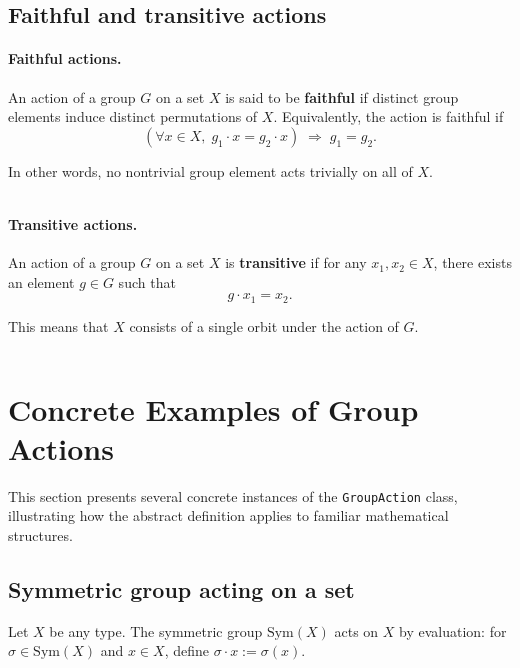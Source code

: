 \documentclass[
  12pt, %
]{assignment}
\newcommand{\leancodeurl}{}
\newcommand{\setleancodeurl}[1]{\renewcommand{\leancodeurl}{#1}}
\newcommand{\leancodefile}[3][]{%
  \setleancodeurl{#3}%
  \inputminted[fontsize=\footnotesize,breaklines,breakanywhere,tabsize=4,showspaces=false,linenos=true,#1]{lean4}{#2}%
}
\begin{document}
\subsection{Faithful and transitive actions}

\paragraph{Faithful actions.}
An action of a group $G$ on a set $X$ is said to be \textbf{faithful} if distinct
group elements induce distinct permutations of $X$. Equivalently, the action is
faithful if
\[
	(\forall x \in X,\; g_1 \cdot x = g_2 \cdot x) \;\Longrightarrow\; g_1 = g_2.
\]

In other words, no nontrivial group element acts trivially on all of $X$.

\leancodefile[
	firstline=25,
	lastline=26,
	firstnumber=25
]{../lean/GroupAction/Defs.lean}
{https://github.com/FrankieeW/GroupAction/blob/v1.2.0/lean/GroupAction/Defs.lean}

\paragraph{Transitive actions.}
An action of a group $G$ on a set $X$ is \textbf{transitive} if for any
$x_1, x_2 \in X$, there exists an element $g \in G$ such that
\[
	g \cdot x_1 = x_2.
\]

This means that $X$ consists of a single orbit under the action of $G$.

\leancodefile[
	firstline=33,
	lastline=34,
	firstnumber=33
]{../lean/GroupAction/Defs.lean}
{https://github.com/FrankieeW/GroupAction/blob/v1.2.0/lean/GroupAction/Defs.lean}

\section{Concrete Examples of Group Actions}
This section presents several concrete instances of the \texttt{GroupAction} class,
illustrating how the abstract definition applies to familiar mathematical structures.

\subsection{Symmetric group acting on a set}
Let $X$ be any type. The symmetric group $\mathrm{Sym}(X)$ acts on $X$ by evaluation:
for $\sigma \in \mathrm{Sym}(X)$ and $x \in X$, define $\sigma \cdot x := \sigma(x)$.
\end{document}
